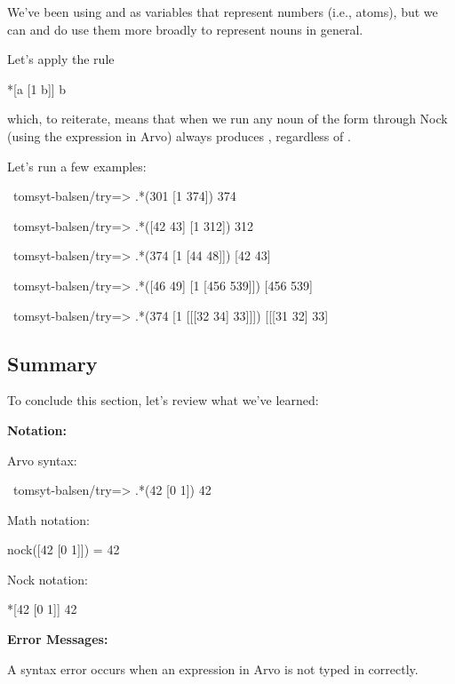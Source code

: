 We've been using  and  as variables that represent numbers (i.e., atoms),
but we can and do use them more broadly to represent nouns in general.

Let's apply the rule

\begin{code}
*[a [1 b]]                  b
\end{code}

which, to reiterate, means that when we run any noun of the form \kode{[a [1 b]]}
through Nock (using the expression  in Arvo) always produces ,
regardless of .

Let's run a few examples:

\begin{code}
~tomsyt-balsen/try=> .*(301 [1 374])
374

~tomsyt-balsen/try=> .*([42 43] [1 312])
312

~tomsyt-balsen/try=> .*(374 [1 [44 48]])
[42 43]

~tomsyt-balsen/try=> .*([46 49] [1 [456 539]])
[456 539]

~tomsyt-balsen/try=> .*(374 [1 [[[32 34] 33]]])
[[[31 32] 33]
\end{code}

\subsection{Summary}

\label{sec:getting_started_summary}

To conclude this section, let's review what we've learned:

\textbf{Notation:}

Arvo syntax:

\begin{code}
~tomsyt-balsen/try=> .*(42 [0 1])
42
\end{code}

Math notation:

\begin{code}
nock([42 [0 1]]) = 42
\end{code}

Nock notation:

\begin{code}
*[42 [0 1]]                  42
\end{code}

\textbf{Error Messages:}

A syntax error occurs when an expression in Arvo is not typed in correctly.

